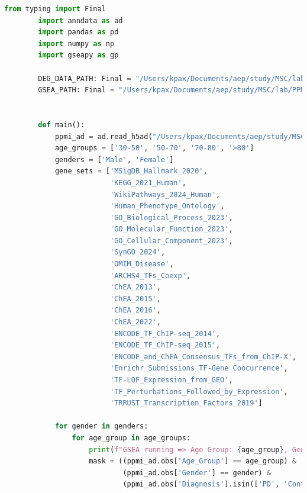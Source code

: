 \documentclass[12pt]{report}
\begin{document}
    \begin{lstlisting}[language=Python,caption={gsea\_stratified\_batch\_consolidated\_visits.py: Ανάλυση εμπλουτισμού με χρήση της βιβλιοθήκης gseapy σε Python}, label=lst:gseastratifiedbatchconsolidatedvisits]
    from typing import Final
        import anndata as ad
        import pandas as pd
        import numpy as np
        import gseapy as gp
        
        DEG_DATA_PATH: Final = "/Users/kpax/Documents/aep/study/MSC/lab/PPMI_Project_133_RNASeq/data/deg_consolidated_visits"
        GSEA_PATH: Final = "/Users/kpax/Documents/aep/study/MSC/lab/PPMI_Project_133_RNASeq/data/gsea"
        
        
        def main():
            ppmi_ad = ad.read_h5ad("/Users/kpax/Documents/aep/study/MSC/lab/PPMI_Project_133_RNASeq/ppmi_adata.h5ad")
            age_groups = ['30-50', '50-70', '70-80', '>80']
            genders = ['Male', 'Female']
            gene_sets = ['MSigDB_Hallmark_2020',
                         'KEGG_2021_Human',
                         'WikiPathways_2024_Human',
                         'Human_Phenotype_Ontology',
                         'GO_Biological_Process_2023',
                         'GO_Molecular_Function_2023',
                         'GO_Cellular_Component_2023',
                         'SynGO_2024',
                         'OMIM_Disease',
                         'ARCHS4_TFs_Coexp',
                         'ChEA_2013',
                         'ChEA_2015',
                         'ChEA_2016',
                         'ChEA_2022',
                         'ENCODE_TF_ChIP-seq_2014',
                         'ENCODE_TF_ChIP-seq_2015',
                         'ENCODE_and_ChEA_Consensus_TFs_from_ChIP-X',
                         'Enrichr_Submissions_TF-Gene_Coocurrence',
                         'TF-LOF_Expression_from_GEO',
                         'TF_Perturbations_Followed_by_Expression',
                         'TRRUST_Transcription_Factors_2019']
        
            for gender in genders:
                for age_group in age_groups:
                    print(f"GSEA running => Age Group: {age_group}, Gender: {gender}")
                    mask = ((ppmi_ad.obs['Age_Group'] == age_group) &
                            (ppmi_ad.obs['Gender'] == gender) &
                            (ppmi_ad.obs['Diagnosis'].isin(['PD', 'Control'])))
        

\end{lstlisting}
\end{document}
